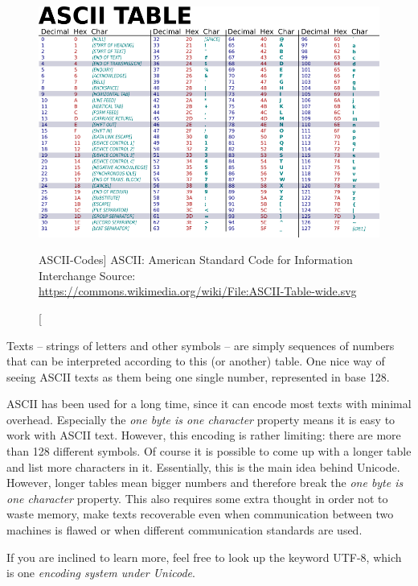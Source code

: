 \begin{figure}
\includegraphics[width=\linewidth]{./gfx/ASCII_table}\newline
\caption
	[ASCII-Codes]
	{ASCII: American Standard Code for Information Interchange\newline
         Source: \url{https://commons.wikimedia.org/wiki/File:ASCII-Table-wide.svg}
    }
\label{fig:ASCII}
\end{figure}

Texts -- \ie strings of letters and other symbols -- are simply sequences of numbers that can be interpreted according to this (or another) table. One nice way of seeing ASCII texts as them being one single number, represented in base 128.

\begin{plusbox}
ASCII has been used for a long time, since it can encode most texts with minimal overhead. Especially the \emph{one byte is one character} property means it is easy to work with ASCII text. However, this encoding is rather limiting: there are more than 128 different symbols\citationneeded. Of course it is possible to come up with a longer table and list more characters in it. Essentially, this is the main idea behind Unicode. However, longer tables mean bigger numbers and therefore break the \emph{one byte is one character} property. This also requires some extra thought in order not to waste memory, make texts recoverable even when communication between two machines is flawed or when different communication standards are used.

If you are inclined to learn more, feel free to look up the keyword UTF-8, which is one \emph{encoding system under Unicode}.
\end{plusbox}

